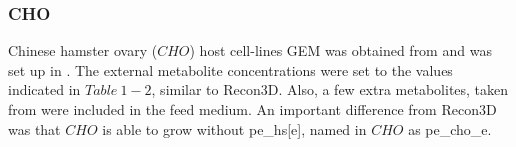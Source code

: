 	\subsubsection{CHO}
	
	Chinese hamster ovary ($CHO$) host cell-lines GEM was obtained from  and was set up in .  The external metabolite concentrations were set to the values indicated in $Table\ 1-2$, similar to Recon3D. Also, a few extra metabolites, taken from  were included in the feed medium. An important difference from Recon3D was that $CHO$ is able to grow without pe\_hs[e], named in $CHO$ as pe\_cho\_e. 